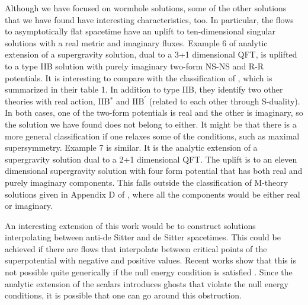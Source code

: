 Although we have focused on wormhole solutions, some of the other solutions that we have found have interesting characteristics, too.
In particular, the flows to asymptotically flat spacetime have an uplift to ten-dimensional singular solutions with a real metric and imaginary fluxes.
Example 6 of analytic extension of a supergravity solution, dual to a 3+1 dimensional QFT, is uplifted to a type IIB solution with purely imaginary two-form NS-NS and R-R  potentials.
It is interesting to compare with the classification of \cite{Bergshoeff:2007cg}, which is summarized in their table 1.
In addition to type IIB, they identify two other theories with real action, IIB${}^*$ and $\text{IIB}^\prime$ (related to each other through S-duality).
In both cases, one of the two-form potentials is real and the other is imaginary, so the solution we have found does not belong to either.
It might be that there is a more general classification if one relaxes some of the conditions, such as maximal supersymmetry.
Example 7 is similar.
It is the analytic extension of a supergravity solution dual to a 2+1 dimensional QFT.
The uplift is to an eleven dimensional supergravity solution with four form potential that has both real and purely imaginary components.
This falls outside the classification of M-theory solutions given in Appendix D of \cite{Bergshoeff:2007cg}, where all the components would be either real or imaginary.

An interesting extension of this work would be to construct solutions interpolating between anti-de Sitter and de Sitter spacetimes.
This could be achieved if there are flows that interpolate between critical points of the superpotential with negative and positive values.
Recent works show that this is not possible quite generically if the null energy condition is satisfied \cite{Kiritsis:2019wyk,Kiritsis:2025ytb}.
Since the analytic extension of the scalars introduces ghosts that violate the null energy conditions, it is possible that one can go around this obstruction.

